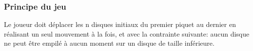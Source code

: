 \documentclass{beamer}%
\begin{document}
			\begin{frame}
				\frametitle{Principe du jeu}
				\begin{figure}
					\centering
					\qquad
				\end{figure}
				
				Le joueur doit déplacer les n disques initiaux du premier piquet au dernier
				en réalisant un seul mouvement à la fois, et avec la contrainte suivante:
				aucun disque ne peut être empilé à aucun moment sur un disque de taille inférieure.				
			\end{frame}
		
\end{document}
